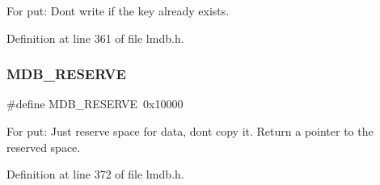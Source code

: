 For put\+: Don\textquotesingle{}t write if the key already exists. 

Definition at line 361 of file lmdb.\+h.

\mbox{\label{group__mdb__put_gac0545c6aea719991e3eae6ccc686efcc}} 
\subsubsection{\texorpdfstring{M\+D\+B\+\_\+\+R\+E\+S\+E\+R\+VE}{MDB\_RESERVE}}
{\footnotesize\ttfamily \#define M\+D\+B\+\_\+\+R\+E\+S\+E\+R\+VE~0x10000}

For put\+: Just reserve space for data, don\textquotesingle{}t copy it. Return a pointer to the reserved space. 

Definition at line 372 of file lmdb.\+h.

